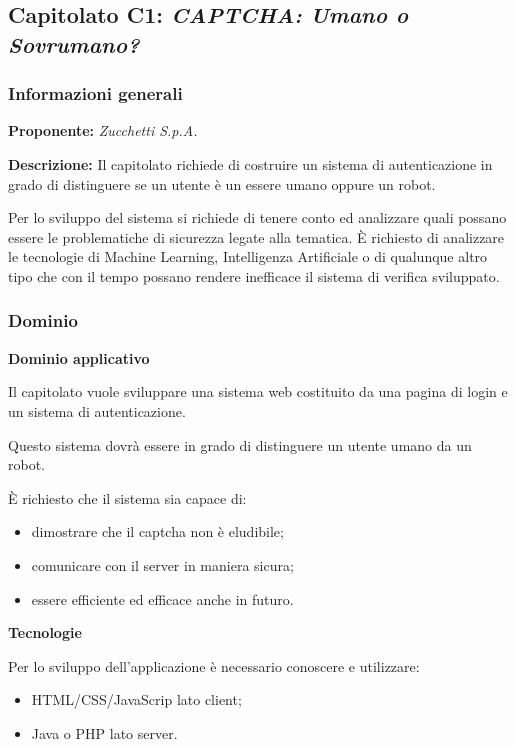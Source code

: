 \subsection{Capitolato C1: \textit{CAPTCHA: Umano o Sovrumano?}}

\subsubsection{Informazioni generali}

\textbf{Proponente:} \textit{Zucchetti S.p.A.}

\textbf{Descrizione:}
Il capitolato richiede di costruire un sistema di autenticazione in grado di distinguere se un utente è un essere umano oppure un robot.

Per lo sviluppo del sistema si richiede di tenere conto ed analizzare quali possano essere le problematiche di sicurezza legate alla tematica. È richiesto di analizzare le tecnologie di Machine Learning, Intelligenza Artificiale o di qualunque altro tipo che con il tempo possano rendere inefficace il sistema di verifica sviluppato.

\subsubsection{Dominio}

\textbf{Dominio applicativo}

Il capitolato vuole sviluppare una sistema web costituito da una pagina di login e un sistema di autenticazione.

Questo sistema dovrà essere in grado di distinguere un utente umano da un robot.

È richiesto che il sistema sia capace di:
\begin{itemize}
    \item dimostrare che il captcha non è eludibile;
    \item comunicare con il server in maniera sicura;
    \item essere efficiente ed efficace anche in futuro.
\end{itemize}

\textbf{Tecnologie}

Per lo sviluppo dell'applicazione è necessario conoscere e utilizzare:
\begin{itemize}
    \item HTML/CSS/JavaScrip lato client;
    \item Java o PHP lato server.
\end{itemize}

